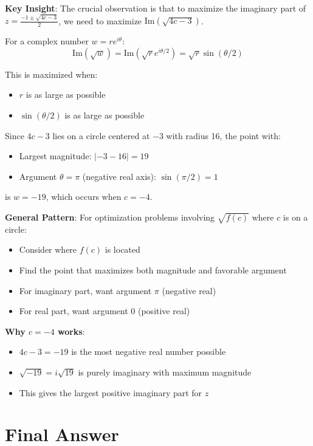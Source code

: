 \documentclass[11pt]{article}
\begin{document}
\begin{keyinsightbox}
\textbf{Key Insight}: The crucial observation is that to maximize the imaginary part of $z = \frac{-1 \pm \sqrt{4c-3}}{2}$, we need to maximize $\text{Im}(\sqrt{4c-3})$.

For a complex number $w = re^{i\theta}$:
\[\text{Im}(\sqrt{w}) = \text{Im}(\sqrt{r}e^{i\theta/2}) = \sqrt{r}\sin(\theta/2)\]

This is maximized when:
\begin{itemize}
    \item $r$ is as large as possible
    \item $\sin(\theta/2)$ is as large as possible
\end{itemize}

Since $4c - 3$ lies on a circle centered at $-3$ with radius 16, the point with:
\begin{itemize}
    \item Largest magnitude: $|-3 - 16| = 19$
    \item Argument $\theta = \pi$ (negative real axis): $\sin(\pi/2) = 1$
\end{itemize}

is $w = -19$, which occurs when $c = -4$.

\textbf{General Pattern}: For optimization problems involving $\sqrt{f(c)}$ where $c$ is on a circle:
\begin{itemize}
    \item Consider where $f(c)$ is located
    \item Find the point that maximizes both magnitude and favorable argument
    \item For imaginary part, want argument $\pi$ (negative real)
    \item For real part, want argument $0$ (positive real)
\end{itemize}

\textbf{Why $c = -4$ works}: 
\begin{itemize}
    \item $4c - 3 = -19$ is the most negative real number possible
    \item $\sqrt{-19} = i\sqrt{19}$ is purely imaginary with maximum magnitude
    \item This gives the largest positive imaginary part for $z$
\end{itemize}
\end{keyinsightbox}

\section*{Final Answer}
\end{document}
